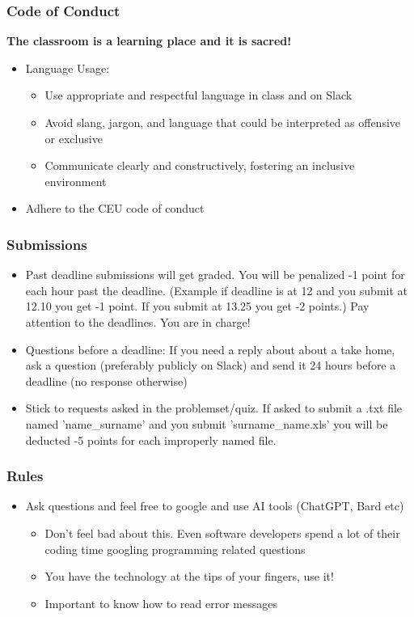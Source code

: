 \documentclass[compress, aspectratio=54]{beamer}
\begin{document}
\begin{frame}
\frametitle{Code of Conduct}

\textbf{The classroom is a learning place and it is sacred!}

\begin{itemize}
  \item Language Usage:
  \begin{itemize}
    \item Use appropriate and respectful language in class and on Slack
    \item Avoid slang, jargon, and language that could be interpreted as offensive or exclusive
    \item Communicate clearly and constructively, fostering an inclusive environment
  \end{itemize}
  \item Adhere to the CEU code of conduct
\end{itemize}
\end{frame}


\begin{frame}
\frametitle{Submissions}

\begin{itemize}
\item Past deadline submissions will get graded. You will be penalized -1 point for each hour past the deadline. (Example if deadline is at 12 and you submit at 12.10 you get -1 point. If you submit at 13.25 you get -2 points.) Pay attention to the deadlines. You are in charge!
\item Questions before a deadline: If you need a reply about about a take home, ask a question (preferably publicly on Slack) and send it 24 hours before a deadline (no response otherwise)
\item  Stick to requests asked in the problemset/quiz. If asked to submit a .txt file named 'name\_surname'  and you submit 'surname\_name.xls' you will be deducted -5 points for each improperly named file.
\end{itemize}

\end{frame}



\begin{frame}
\frametitle{Rules}
\begin{itemize}
\item Ask questions and feel free to google and use AI tools (ChatGPT, Bard etc)
\begin{itemize}
\item Don't feel bad about this. Even software developers spend a lot of their coding time googling programming related questions
\item You have the technology at the tips of your fingers, use it!

\item Important to know how to read error messages
\end{itemize}
\end{itemize}
\end{frame}
\end{document}
